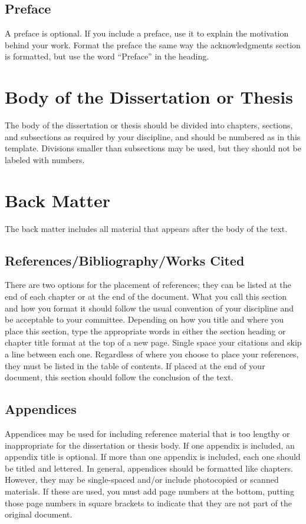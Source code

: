 \subsection{Preface}

A preface is optional.
If you include a preface, use it to explain the motivation behind your work.
Format the preface the same way the acknowledgments section is formatted, but use the word ``Preface'' in the heading.

\section{Body of the Dissertation or Thesis}

The body of the dissertation or thesis should be divided into chapters, sections, and subsections as required by your discipline, and should be numbered as in this template.
Divisions smaller than subsections may be used, but they should not be labeled with numbers.

\section{Back Matter}

The back matter includes all material that appears after the body of the text.

\subsection{References/Bibliography/Works Cited}

There are two options for the placement of references; they can be listed at the end of each chapter or at the end of the document.
What you call this section and how you format it should follow the usual convention of your discipline and be acceptable to your committee.
Depending on how you title and where you place this section, type the appropriate words in either the section heading or chapter title format at the top of a new page.
Single space your citations and skip a line between each one.
Regardless of where you choose to place your references, they must be listed in the table of contents.
If placed at the end of your document, this section should follow the conclusion of the text.

\subsection{Appendices}

Appendices may be used for including reference material that is too lengthy or inappropriate for the dissertation or thesis body.
If one appendix is included, an appendix title is optional.
If more than one appendix is included, each one should be titled and lettered.
In general, appendices should be formatted like chapters.
However, they may be single-spaced and/or include photocopied or scanned materials.
If these are used, you must add page numbers at the bottom, putting those page numbers in square brackets to indicate that they are not part of the original document.

